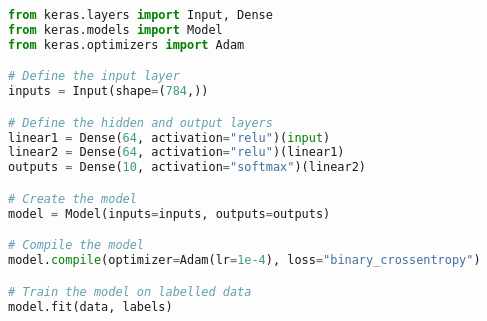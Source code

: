 \begin{lstlisting}[float={ht},caption={A small code snippet defining a simple fully connected ANN with an input of a 1D tensor of length 784, two hidden layers both containing 64 units with ReLU activation functions, and an output layer containing 10 units using the softmax activation function. The network is then trained using the Keras implementation of the Adam optimiser to minimise the binary cross-entropy loss.},label={lst:keras},language=Python,upquote=true]
from keras.layers import Input, Dense
from keras.models import Model
from keras.optimizers import Adam

# Define the input layer
inputs = Input(shape=(784,))

# Define the hidden and output layers
linear1 = Dense(64, activation="relu")(input)
linear2 = Dense(64, activation="relu")(linear1)
outputs = Dense(10, activation="softmax")(linear2)

# Create the model
model = Model(inputs=inputs, outputs=outputs)

# Compile the model
model.compile(optimizer=Adam(lr=1e-4), loss="binary_crossentropy")

# Train the model on labelled data
model.fit(data, labels)
\end{lstlisting}